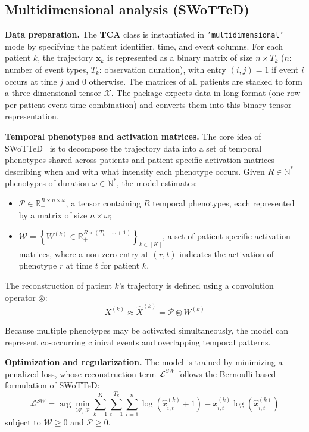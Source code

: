 \documentclass[a4paper]{cas-sc}
\newcommand{\code}[1]{\texttt{#1}}
\newcommand{\pkg}[1]{\textbf{#1}}
\begin{document}
\subsection{Multidimensional analysis (SWoTTeD)}\label{sec:multi}

\textbf{Data preparation.}
The \pkg{TCA} class is instantiated in \code{'multidimensional'} mode by specifying the patient identifier, time, and event columns. 
For each patient $k$, the trajectory $\boldsymbol{x}_k$ is represented as a binary matrix of size $n \times T_k$ ($n$: number of event types, $T_k$: observation duration), with entry $(i,j)=1$ if event $i$ occurs at time $j$ and $0$ otherwise. 
The matrices of all patients are stacked to form a three-dimensional tensor $\mathcal{X}$. 
The package expects data in long format (one row per patient-event-time combination) and converts them into this binary tensor representation.

\textbf{Temporal phenotypes and activation matrices.}
The core idea of SWoTTeD~\cite{sebia2024swotted} is to decompose the trajectory data into a set of temporal phenotypes shared across patients and patient-specific activation matrices describing when and with what intensity each phenotype occurs.
Given $R \in \mathbb{N}^*$ phenotypes of duration $\omega \in \mathbb{N}^*$, the model estimates:
\begin{itemize}
  \item $\mathcal{P} \in \mathbb{R}_+^{R \times n \times \omega}$, a tensor containing $R$ temporal phenotypes, each represented by a matrix of size $n \times \omega$;
  \item $\mathcal{W} = \left\{W^{(k)} \in \mathbb{R}_+^{R \times (T_k-\omega+1)}\right\}_{k \in [K]}$, a set of patient-specific activation matrices, where a non-zero entry at $(r,t)$ indicates the activation of phenotype $r$ at time $t$ for patient $k$.
\end{itemize}
 
The reconstruction of patient $k$'s trajectory is defined using a convolution operator $\circledast$:
\begin{equation}
  X^{(k)} \approx \widehat{X}^{(k)} = \mathcal{P} \circledast W^{(k)}
  \label{eq:x_eq}
\end{equation}
 
Because multiple phenotypes may be activated simultaneously, the model can represent co-occurring clinical events and overlapping temporal patterns.

\textbf{Optimization and regularization.}
The model is trained by minimizing a penalized loss, whose reconstruction term $\mathcal{L}^{SW}$ follows the Bernoulli-based formulation of SWoTTeD:
\begin{equation}
  \mathcal{L}^{SW} = \arg\min_{\mathcal{W},\,\mathcal{P}} \sum_{k=1}^{K} \sum_{t=1}^{T_k} \sum_{i=1}^{n} \log\!\left(\hat{x}^{(k)}_{i,t}+1\right) -x^{(k)}_{i,t}\log\!\left(\hat{x}^{(k)}_{i,t}\right)
  \label{eq:recon_loss}
\end{equation}
subject to $\mathcal{W}\geq0$ and $\mathcal{P}\geq0$.
 
\end{document}
